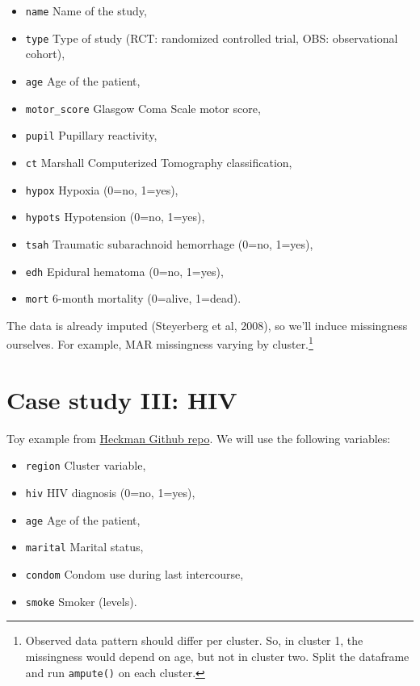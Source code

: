\documentclass[
]{jss}
\providecommand{\tightlist}{%
  \setlength{\itemsep}{0pt}\setlength{\parskip}{0pt}}
\begin{document}
\begin{itemize}
\tightlist
\item
  \texttt{name} Name of the study,
\item
  \texttt{type} Type of study (RCT: randomized controlled trial, OBS:
  observational cohort),
\item
  \texttt{age} Age of the patient,
\item
  \texttt{motor\_score} Glasgow Coma Scale motor score,
\item
  \texttt{pupil} Pupillary reactivity,
\item
  \texttt{ct} Marshall Computerized Tomography classification,
\item
  \texttt{hypox} Hypoxia (0=no, 1=yes),
\item
  \texttt{hypots} Hypotension (0=no, 1=yes),
\item
  \texttt{tsah} Traumatic subarachnoid hemorrhage (0=no, 1=yes),
\item
  \texttt{edh} Epidural hematoma (0=no, 1=yes),
\item
  \texttt{mort} 6-month mortality (0=alive, 1=dead).
\end{itemize}

The data is already imputed (Steyerberg et al, 2008), so we'll induce
missingness ourselves. For example, MAR missingness varying by
cluster.\footnote{Observed data pattern should differ per cluster. So,
  in cluster 1, the missingness would depend on age, but not in cluster
  two. Split the dataframe and run \texttt{ampute()} on each cluster.}

\hypertarget{case-study-iii-hiv}{%
\section{Case study III: HIV}\label{case-study-iii-hiv}}

Toy example from
\href{https://github.com/johamunoz/Heckman-IPDMA/blob/main/Toy_example.R}{Heckman
Github repo}. We will use the following variables:

\begin{itemize}
\tightlist
\item
  \texttt{region} Cluster variable,
\item
  \texttt{hiv} HIV diagnosis (0=no, 1=yes),
\item
  \texttt{age} Age of the patient,
\item
  \texttt{marital} Marital status,
\item
  \texttt{condom} Condom use during last intercourse,
\item
  \texttt{smoke} Smoker (levels).
\end{itemize}
\end{document}
